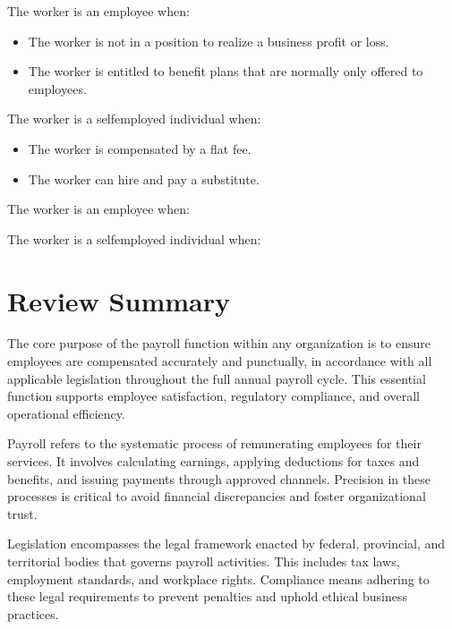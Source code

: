 \documentclass[letterpaper,10pt,english]{sphinxmanual}
\begin{document}
\sphinxAtStartPar
The worker is an employee when:
\begin{itemize}
\item {} 
\sphinxAtStartPar
The worker is not in a position to realize a business profit or loss.

\item {} 
\sphinxAtStartPar
The worker is entitled to benefit plans that are normally only offered to employees.

\end{itemize}

\sphinxAtStartPar
The worker is a self\sphinxhyphen{}employed individual when:
\begin{itemize}
\item {} 
\sphinxAtStartPar
The worker is compensated by a flat fee.

\item {} 
\sphinxAtStartPar
The worker can hire and pay a substitute.

\end{itemize}

\sphinxAtStartPar
The worker is an employee when:

\sphinxAtStartPar
The worker is a self\sphinxhyphen{}employed individual when:


\section{Review Summary}
\label{\detokenize{compliance:review-summary}}
\sphinxAtStartPar
The core purpose of the payroll function within any organization is to ensure employees are compensated accurately and
punctually, in accordance with all applicable legislation throughout the full annual payroll cycle. This essential function
supports employee satisfaction, regulatory compliance, and overall operational efficiency.

\sphinxAtStartPar
Payroll refers to the systematic process of remunerating employees for their services. It involves calculating earnings,
applying deductions for taxes and benefits, and issuing payments through approved channels. Precision in these processes is
critical to avoid financial discrepancies and foster organizational trust.

\sphinxAtStartPar
Legislation encompasses the legal framework enacted by federal, provincial, and territorial bodies that governs payroll
activities. This includes tax laws, employment standards, and workplace rights. Compliance means adhering to these legal
requirements to prevent penalties and uphold ethical business practices.
\end{document}
